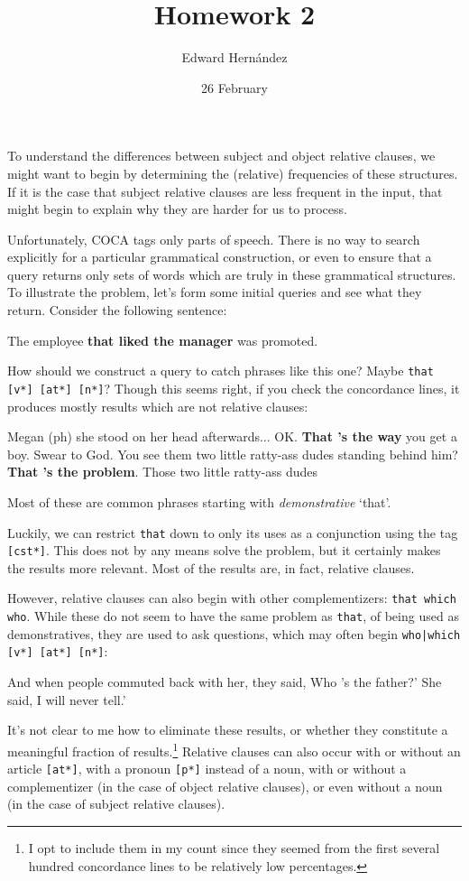 \documentclass[doc,12pt]{apa6}
\begin{document}
\title{Homework 2}
\author{Edward Hern\'{a}ndez}
\date{26 February}
\maketitle

To understand the differences between subject and object relative clauses, we
might want to begin by determining the (relative) frequencies of these
structures. If it is the case that subject relative clauses are less frequent
in the input, that might begin to explain why they are harder for us to
process.

Unfortunately, COCA tags only parts of speech. There is no way to search
explicitly for a particular grammatical construction, or even to ensure that a
query returns only sets of words which are truly in these grammatical
structures. 
To illustrate the problem, let's form some initial queries and see what they
return. Consider the following sentence:
\begin{exe}
	\ex The employee \textbf{that liked the manager} was promoted.
\end{exe}
How should we construct a query to catch phrases like this one? Maybe
\texttt{that {[}v*{]} {[}at*{]} {[}n*{]}}? Though this seems right, if you check the concordance lines, it produces mostly results which are not relative clauses:
\begin{exe}
	\ex Megan (ph) she stood on her head afterwards... OK. \textbf{That 's the way} you get a boy. Swear to God.
	\ex You see them two little ratty-ass dudes standing behind him? \textbf{That 's the problem}. Those two little ratty-ass dudes
\end{exe}
Most of these are common phrases starting with \emph{demonstrative} `that'.

Luckily, we can restrict \texttt{that} down to only its uses as a conjunction
using the tag \texttt{{[}cst*{]}}. This does not by any means solve the
problem, but it certainly makes the results more relevant. Most of the results
are, in fact, relative clauses.

However, relative clauses can also begin with other complementizers:
\texttt{that which who}. While these do not seem to have the same problem as
\texttt{that}, of being used as demonstratives, they are used to ask questions,
which may often begin \texttt{who|which {[}v*{]} {[}at*{]} {[}n*{]}}:
\begin{exe}
	\ex And when people commuted back with her, they said, Who 's the father?' She said, I will never tell.'
\end{exe}
It's not clear to me how to eliminate these results, or whether they constitute
a meaningful fraction of results.\footnote{I opt to include them in my count
since they seemed from the first several hundred concordance lines to be
relatively low percentages.} Relative clauses can also occur with or without an
article \texttt{{[}at*{]}}, with a pronoun \texttt{{[}p*{]}} instead of a noun,
with or without a complementizer (in the case of object relative clauses), or
even without a noun (in the case of subject relative clauses).
\end{document}
